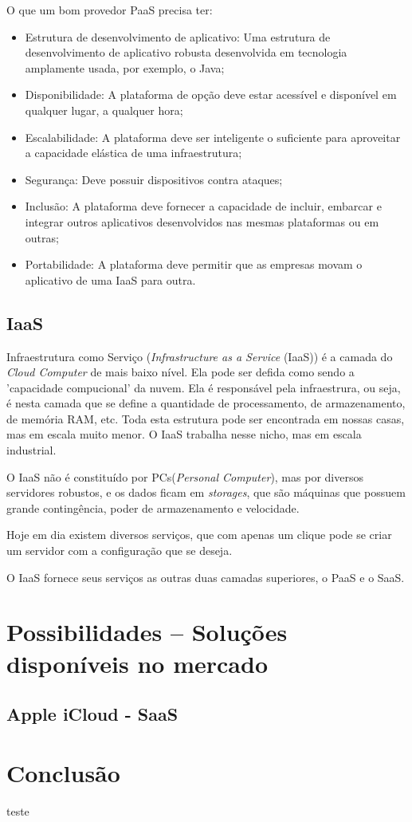 \documentclass{abnt}
\begin{document}
	O que um bom provedor PaaS precisa ter:
	
	\begin{itemize}
		\item Estrutura de desenvolvimento de aplicativo: Uma estrutura de desenvolvimento de aplicativo robusta desenvolvida em tecnologia amplamente usada, por exemplo, o Java;
            	\item Disponibilidade: A plataforma de opção deve estar acessível e disponível em qualquer lugar, a qualquer hora;
            	\item Escalabilidade: A plataforma deve ser inteligente o suficiente para aproveitar a capacidade elástica de uma infraestrutura;
            	\item Segurança: Deve possuir dispositivos contra ataques;
            	\item Inclusão: A plataforma deve fornecer a capacidade de incluir, embarcar e integrar outros aplicativos desenvolvidos nas mesmas plataformas ou em outras;
            	\item Portabilidade: A plataforma deve permitir que as empresas movam o aplicativo de uma IaaS para outra.
	\end{itemize}

	\section{IaaS}
		Infraestrutura como Serviço (\textit{Infrastructure as a Service} (IaaS)) é a camada do \textit{Cloud Computer} de mais baixo nível. Ela pode ser defida como sendo a 'capacidade compucional' da nuvem. Ela é responsável pela infraestrura, ou seja, é nesta camada que se define a quantidade de processamento, de armazenamento, de memória RAM, etc. Toda esta estrutura pode ser encontrada em nossas casas, mas em escala muito menor. O IaaS trabalha nesse nicho, mas em escala industrial.
		
		O IaaS não é constituído por PCs(\textit{Personal Computer}), mas por diversos servidores robustos, e os dados ficam em \textit{storages}, que são máquinas que possuem grande contingência, poder de armazenamento e velocidade.
		
		Hoje em dia existem diversos serviços, que com apenas um clique pode se criar um servidor com a configuração que se deseja.
		
		O IaaS fornece seus serviços as outras duas camadas superiores, o PaaS e o SaaS.
		 
	\chapter{Possibilidades -- Soluções disponíveis no mercado}
	  \section{Apple iCloud - SaaS}
	\chapter{Conclusão}
		teste
\end{document}
